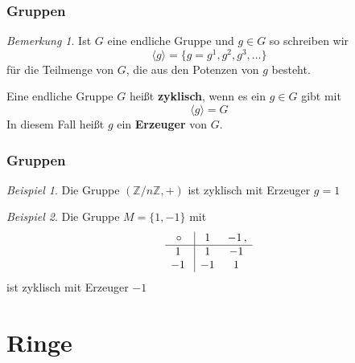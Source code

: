 \documentclass[hyperref={pdfpagelabels=false}]{beamer}
\theoremstyle{plain}%
\theoremstyle{definition}
\theoremstyle{remark}
\newtheorem*{beispiel}{Beispiel}
\newtheorem*{notiz}{Bemerkung}
\def \Z{\mathbb Z}
\begin{document}
\begin{frame}
\frametitle{Gruppen}

\begin{notiz} Ist $G$ eine endliche Gruppe und $g \in G$ so schreiben wir
  	$$ \langle g \rangle  = \{ g = g^1, g^2, g^3, \ldots \} $$
für die Teilmenge von $G$, die aus den Potenzen von $g$ besteht.
\end{notiz}

\pause 

\begin{definition} Eine endliche Gruppe $G$ heißt 
\textbf{zyklisch}, wenn es ein $g \in G$ gibt mit 
  	$$ \langle g \rangle = G $$
In diesem Fall heißt $g$ ein \textbf{Erzeuger} von $G$.
\end{definition}


\end{frame}

\begin{frame}
\frametitle{Gruppen}

\begin{beispiel} Die Gruppe $(\Z/n\Z, +)$ ist zyklisch mit Erzeuger $g = 1$
\end{beispiel}

\pause 

\begin{beispiel}
Die Gruppe $M = \{1,-1\}$ mit 
	 $$ \begin{array} { c | c c  }
  	\circ \, & \, 1 \, & \, -1 \, ,  \\ \hline
  	1\, \, & 1 & -1  \\
  	-1\, \, & -1 & 1 \\
  	\end{array} $$
ist zyklisch mit Erzeuger $-1$
\end{beispiel} 

\end{frame}

\section{Ringe}
\end{document}
